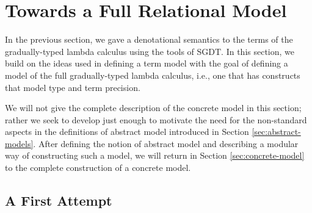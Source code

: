 \section{Towards a Full Relational Model}\label{sec:towards-relational-model}



In the previous section, we gave a denotational semantics to the terms of the
gradually-typed lambda calculus using the tools of SGDT. In this section, we
build on the ideas used in defining a term model with the goal of defining a
model of the full gradually-typed lambda calculus, i.e., one that has constructs
that model type and term precision.
%

We will not give the complete description of the concrete model in this section;
rather we seek to develop just enough to motivate the need for the non-standard
aspects in the definitions of abstract model introduced in Section
\ref{sec:abstract-models}. After defining the notion of abstract model and
describing a modular way of constructing such a model, we will return in Section
\ref{sec:concrete-model} to the complete construction of a concrete model.  

\subsection{A First Attempt}



